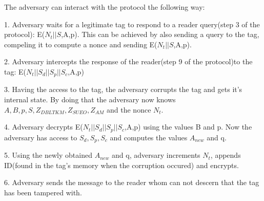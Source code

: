     The adversary can interact with the protocol the following way:

    1. Adversary waits for a legitimate tag to respond to a reader query(step 3 of the protocol): E($N_t||S$,A,p).
    This can be achieved by also sending a query to the tag, compeling it to compute a nonce and sending E($N_t||S$,A,p).
    
    2. Adversary intercepts the response of the reader(step 9 of the protocol)to the tag: E($N_t||S_d||S_p||S_c$,A,p)
    
    3. Having the access to the tag, the adversary corrupts the tag and gets it's internal state. By doing that the adversary now knows $A, B, p, S, Z_{DBLTKM}, Z_{SUEO}, Z_{AM}$ and the nonce $N_t$.
    
    4. Adversary decrypts E($N_t||S_d||S_p||S_c$,A,p) using the values B and p. Now the adversary has access to $S_d, S_p, S_c$ and computes the values $A_{new}$ and q.
    
    5. Using the newly obtained $A_{new}$ and q, adversary increments $N_t$, appends ID(found in the tag's memory when the corruption occured) and encrypts.
    
    6. Adversary sends the message to the reader whom can not descern that the tag has been tampered with.


